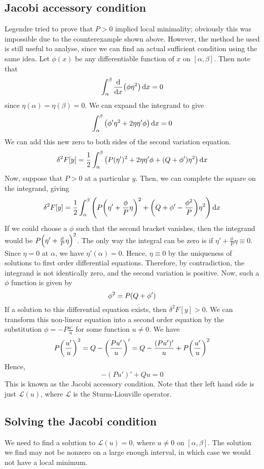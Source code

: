 \subsection{Jacobi accessory condition}
Legendre tried to prove that \( P > 0 \) implied local minimality; obviously this was impossible due to the counterexample shown above.
However, the method he used is still useful to analyse, since we can find an actual sufficient condition using the same idea.
Let \( \phi(x) \) be any differentiable function of \( x \) on \( [\alpha, \beta] \).
Then note that
\[
	\int_\alpha^\beta \dv{x} \qty( \phi \eta^2 ) \dd{x} = 0
\]
since \( \eta(\alpha) = \eta(\beta) = 0 \).
We can expand the integrand to give
\[
	\int_\alpha^\beta \qty( \phi' \eta^2 + 2 \eta \eta' \phi ) \dd{x} = 0
\]
We can add this new zero to both sides of the second variation equation.
\[
	\delta^2 F[y] = \frac{1}{2} \int_\alpha^\beta \qty( P(\eta')^2 + 2 \eta \eta' \phi + \qty(Q + \phi') \eta^2 ) \dd{x}
\]
Now, suppose that \( P > 0 \) at a particular \( y \).
Then, we can complete the square on the integrand, giving
\[
	\delta^2 F[y] = \frac{1}{2} \int_\alpha^\beta \qty( P\qty(\eta' + \frac{\phi}{P} \eta)^2 + \qty(Q + \phi' - \frac{\phi^2}{P}) \eta^2 ) \dd{x}
\]
If we could choose a \( \phi \) such that the second bracket vanishes, then the integrand would be \( P\qty(\eta' + \frac{\phi}{P} \eta)^2 \).
The only way the integral can be zero is if \( \eta' + \frac{\phi}{P} \eta \equiv 0 \).
Since \( \eta = 0 \) at \( \alpha \), we have \( \eta'(\alpha) = 0 \).
Hence, \( \eta \equiv 0 \) by the uniqueness of solutions to first order differential equations.
Therefore, by contradiction, the integrand is not identically zero, and the second variation is positive.
Now, such a \( \phi \) function is given by
\[
	\phi^2 = P\qty(Q + \phi')
\]
If a solution to this differential equation exists, then \( \delta^2 F[y] > 0 \).
We can transform this non-linear equation into a second order equation by the substitution \( \phi = -P \frac{u'}{u} \) for some function \( u \neq 0 \).
We have
\[
	P \qty(\frac{u'}{u})^2 = Q - \qty(\frac{Pu'}{u})' = Q - \frac{(Pu')'}{u} + P \qty(\frac{u'}{u})^2
\]
Hence,
\[
	-(Pu')' + Qu = 0
\]
This is known as the Jacobi accessory condition.
Note that ther left hand side is just \( \mathcal L(u) \), where \( \mathcal L \) is the Sturm-Liouville operator.

\subsection{Solving the Jacobi condition}
We need to find a solution to \( \mathcal L(u) = 0 \), where \( u \neq 0 \) on \( [\alpha, \beta] \).
The solution we find may not be nonzero on a large enough interval, in which case we would not have a local minimum.

